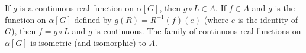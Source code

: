If $g$ is a continuous real function on $\alpha[G]$, then $g \circ L \in A$. If $f \in A$ and $g$ is the function on $\alpha[G]$ defined by $g(R) = R^{-1}(f)(e)$ (where $e$ is the identity of $G$), then $f = g \circ L$ and $g$ is continuous. The family of continuous real functions on $\alpha[G]$ is isometric (and isomorphic) to $A$.
